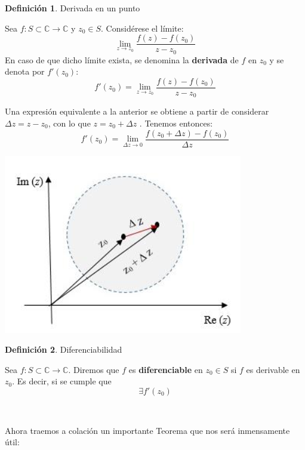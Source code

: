 \documentclass[12pt]{article}
\theoremstyle{definition}
\newtheorem{definition}{Definici\'on}[section]
\theoremstyle{theorem}
\theoremstyle{corolary}
\begin{document}
 \colorbox{red!40!white!80}{\parbox{\linewidth}{
 \theoremstyle{definition}
 \begin{definition}{Derivada en un punto}

  	Sea $f: S \subset \mathbb{C} \rightarrow \mathbb{C}$ y $z_0 \in S$. Consid\'erese el l\'imite:
   $$\lim\limits_{z\rightarrow z_0} \frac{f(z)-f(z_0)}{z-z_0}$$
  	En caso de que dicho l\'imite exista, se denomina la \textbf{derivada} de $f$ en $z_0$ y se denota por $f'(z_0)$: 
 	$$f'(z_0) = \lim\limits_{z\rightarrow z_0} \frac{f(z)-f(z_0)}{z-z_0}$$
 \end{definition}}}
 \linebreak
 
 Una expresi\'on equivalente a la anterior se obtiene a partir de considerar $\Delta z = z-z_0$, con lo que $z = z_0 + \Delta z$ . Tenemos entonces:
 $$f'(z_0) = \lim\limits_{\Delta z\rightarrow 0} \frac{f(z_0 + \Delta z)-f(z_0)}{\Delta z}$$

\begin{center}
	\includegraphics[scale=.9]{grafica_der.png}
\end{center}

\colorbox{red!40!white!80}{\parbox{\linewidth}{
 \theoremstyle{definition}
 \begin{definition}{Diferenciabilidad}

  	Sea $f: S \subset \mathbb{C} \rightarrow \mathbb{C}$. Diremos que $f$ es \textbf{diferenciable} en $z_0 \in S$ si $f$ es derivable en $z_0$. Es decir, si se cumple que $$\exists f'(z_0)$$
 \end{definition}}}\\
 \linebreak

Ahora traemos a colaci\'on un importante Teorema que nos ser\'a inmensamente \'util:\\
\end{document}

